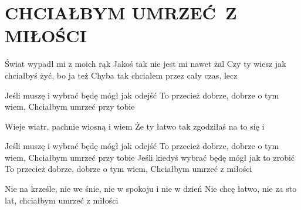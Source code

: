 \documentclass[../../../songbook.tex]{subfiles}
\begin{document}
\TabPositions{8cm} %
\section*{CHCIAŁBYM UMRZEĆ Z MIŁOŚCI}
{}
\vspace{0.5cm}
Świat wypadł mi z moich rąk			    \newline	
Jakoś tak nie jest mi nawet żal				 \newline
Czy ty wiesz jak chciałbyś żyć, bo ja też				 \newline
Chyba tak chciałem przez cały czas, lecz				 \newline

\-\hspace{1cm} Jeśli muszę i wybrać będę mógł jak odejść	  \newline
\-\hspace{1cm} To przecież dobrze, dobrze o tym wiem, 				 \newline
\-\hspace{1cm} Chciałbym umrzeć przy tobie				 \newline

Wieje wiatr, pachnie wiosną i wiem				 \newline
Że ty łatwo tak zgodziłaś na to się i					 \newline

\-\hspace{1cm} Jeśli muszę i wybrać będę mógł jak odejść				 \newline
\-\hspace{1cm} To przecież dobrze, dobrze o tym wiem, 				 \newline
\-\hspace{1cm} Chciałbym umrzeć przy tobie				 \newline
\-\hspace{1cm} Jeśli kiedyś wybrać będę mógł jak to zrobić				 \newline
\-\hspace{1cm} To przecież dobrze, dobrze o tym wiem, 				 \newline
\-\hspace{1cm} Chciałbym umrzeć z miłości				 \newline

Nie na krześle, nie we śnie, nie w spokoju i nie w dzień	  \newline
Nie chcę łatwo, nie za sto lat, chciałbym umrzeć z miłości	  \newline
\end{document}

